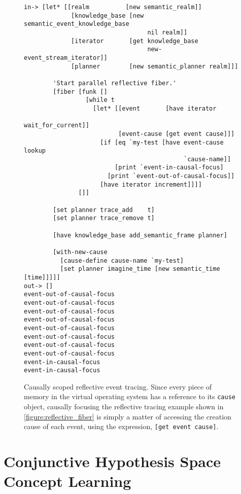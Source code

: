 \begin{figure}[h]
\centering
{\small
\begin{Verbatim}[frame=single]
 in-> [let* [[realm          [new semantic_realm]]
             [knowledge_base [new semantic_event_knowledge_base
                                  nil realm]]
             [iterator       [get knowledge_base
                                  new-event_stream_iterator]]
             [planner        [new semantic_planner realm]]]

        'Start parallel reflective fiber.'
        [fiber [funk []
                 [while t
                   [let* [[event       [have iterator
                                             wait_for_current]]
                          [event-cause [get event cause]]]
                     [if [eq `my-test [have event-cause lookup
                                            `cause-name]]
                         [print `event-in-causal-focus]
                       [print `event-out-of-causal-focus]]
                     [have iterator increment]]]]
               []]
        
        [set planner trace_add    t]
        [set planner trace_remove t]
        
        [have knowledge_base add_semantic_frame planner]
        
        [with-new-cause
          [cause-define cause-name `my-test]
          [set planner imagine_time [new semantic_time [time]]]]]
out-> []
event-out-of-causal-focus
event-out-of-causal-focus
event-out-of-causal-focus
event-out-of-causal-focus
event-out-of-causal-focus
event-out-of-causal-focus
event-out-of-causal-focus
event-out-of-causal-focus
event-in-causal-focus
event-in-causal-focus
\end{Verbatim}
}
\caption[Causally scoped reflective event tracing.]{Causally scoped
  reflective event tracing.  Since every piece of memory in the
  virtual operating system has a reference to its {\tt{cause}} object,
  causally focusing the reflective tracing example shown in
  {\mbox{\autoref{figure:reflective_fiber}}} is simply a matter of
  accessing the creation cause of each event, using the expression,
  {\tt{[get event cause]}}.}
\label{figure:reflective_event_causal_tracing}
\end{figure}

\section{Conjunctive Hypothesis Space Concept Learning}


